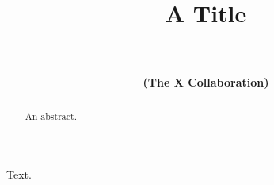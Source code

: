 \documentclass{ptephy}
\providecommand\collaborator[1]{\textbf{#1}\par}
\begin{document}
\title{A Title}
\author{
\\
\\ \collaborator{(The X Collaboration)}}
\address{
}
\begin{abstract}An abstract.\end{abstract}
\maketitle
Text.
\end{document}
